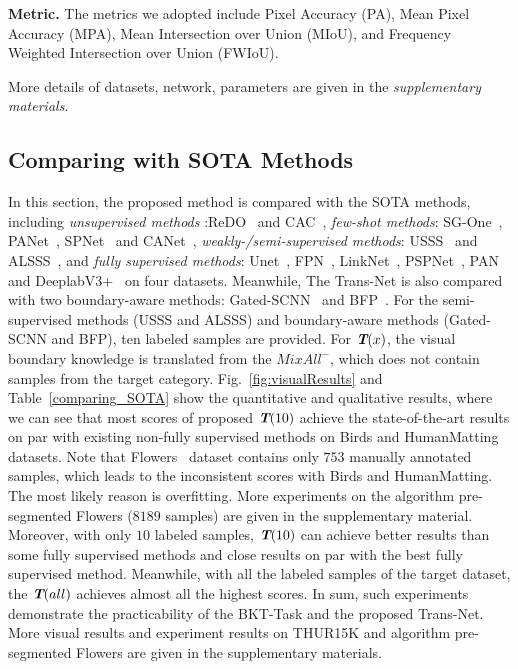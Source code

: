 \documentclass[letterpaper]{article} %
\begin{document}
\textbf{Metric.} The metrics we adopted include Pixel Accuracy (PA), Mean Pixel Accuracy (MPA), Mean Intersection over Union (MIoU), and Frequency Weighted Intersection over Union (FWIoU).

More details of datasets, network, parameters are given in the \emph{supplementary materials}.


\subsection{Comparing with SOTA Methods}

In this section, the proposed method is compared with the SOTA methods,
including \emph{unsupervised methods} :ReDO~\citep{chen2019unsupervised} and CAC~\citep{hsu2018co-attention},
\emph{few-shot methods}: SG-One~\citep{zhang2018sg-one:}, PANet~\citep{wang2019panet:}, SPNet~\citep{xian2019semantic} and CANet~\citep{zhang2019canet:},
\emph{weakly-/semi-supervised methods}: USSS~\citep{kalluri2019universal} and ALSSS~\citep{hung2018adversarial},
and \emph{fully supervised methods}: Unet~\citep{ronneberger2015u-net:}, FPN~\citep{lin2017feature}, LinkNet~\citep{chaurasia2017linknet:}, PSPNet~\citep{zhao2017pyramid}, PAN~\citep{li2018pyramid} and DeeplabV3+~\citep{chen2017rethinking} on four datasets.
Meanwhile, The Trans-Net is also compared with two boundary-aware methods: Gated-SCNN~\citep{takikawa2019gated-scnn} and BFP~\citep{ding2019boundary-aware}.
For the semi-supervised methods (USSS and ALSSS) and boundary-aware methods (Gated-SCNN and BFP), ten labeled samples are provided.
For $\textbf{\em T}(x)$, the visual boundary knowledge is translated from the $MixAll^{-}$, which does not contain  samples from the target category.
Fig.~\ref{fig:visualResults} and Table~\ref{comparing_SOTA} show the quantitative and qualitative results, where we can see that most scores of proposed $\textbf{\em T}(10)$ achieve the state-of-the-art results on par with existing non-fully supervised methods on Birds and HumanMatting datasets.
Note that Flowers~\citep{nilsback2007delving} dataset contains only $753$ manually annotated samples, which leads to the inconsistent scores with Birds and HumanMatting.
The most likely reason is overfitting. More experiments on the algorithm pre-segmented Flowers ($8189$ samples) are given in the supplementary material.
Moreover, with only $10$ labeled samples, $\textbf{\em T}(10)$ can achieve better results than some fully supervised methods and close results on par with the best fully supervised method. Meanwhile, with all the labeled samples of the target dataset, the $\textbf{\em T}(all)$ achieves almost all the highest scores.
In sum, such experiments demonstrate the practicability of the BKT-Task and the proposed Trans-Net.
More visual results and experiment results on THUR15K and algorithm pre-segmented Flowers are given in the supplementary materials.
\end{document}
